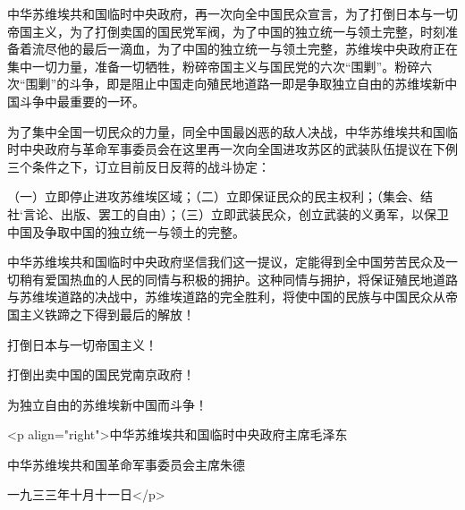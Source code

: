 中华苏维埃共和国临时中央政府，再一次向全中国民众宣言，为了打倒日本与一切帝国主义，为了打倒卖国的国民党军阀，为了中国的独立统一与领土完整，时刻准备着流尽他的最后一滴血，为了中国的独立统一与领土完整，苏维埃中央政府正在集中一切力量，准备一切牺牲，粉碎帝国主义与国民党的六次“围剿”。粉碎六次“围剿”的斗争，即是阻止中国走向殖民地道路一即是争取独立自由的苏维埃新中国斗争中最重要的一环。

为了集中全国一切民众的力量，同全中国最凶恶的敌人决战，中华苏维埃共和国临时中央政府与革命军事委员会在这里再一次向全国进攻苏区的武装队伍提议在下例三个条件之下，订立目前反日反蒋的战斗协定：

（一）立即停止进攻苏维埃区域；（二）立即保证民众的民主权利；（集会、结社`言论、出版、罢工的自由）；（三）立即武装民众，创立武装的义勇军，以保卫中国及争取中国的独立统一与领土的完整。

中华苏维埃共和国临时中央政府坚信我们这一提议，定能得到全中国劳苦民众及一切稍有爱国热血的人民的同情与积极的拥护。这种同情与拥护，将保证殖民地道路与苏维埃道路的决战中，苏维埃道路的完全胜利，将使中国的民族与中国民众从帝国主义铁蹄之下得到最后的解放！

打倒日本与一切帝国主义！

打倒出卖中国的国民党南京政府！

为独立自由的苏维埃新中国而斗争！

<p align="right">中华苏维埃共和国临时中央政府主席毛泽东

中华苏维埃共和国革命军事委员会主席朱德

一九三三年十月十一日</p>

